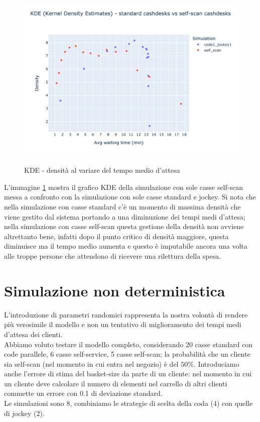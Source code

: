 \begin{figure}[H]
	\centering
	\includegraphics[width=12cm]{"images/results/kde_self_scan.png"}
	\label{fig:kde_self_scan}
	\caption{KDE - densità al variare del tempo medio d'attesa}
\end{figure}

L'immagine \ref{fig:kde_self_scan} mostra il grafico KDE della simulazione con sole casse self-scan messa a confronto con la simulazione con sole casse standard e jockey. Si nota che nella simulazione con casse standard c'è un momento di massima densità che viene gestito dal sistema portando a una diminuzione dei tempi medi d'attesa; nella simulazione con casse self-scan questa gestione della densità non avviene altrettanto bene, infatti dopo il punto critico di densità maggiore, questa diminuisce ma il tempo medio aumenta e questo è imputabile ancora una volta alle troppe persone che attendono di ricevere una rilettura della spesa.

\section{Simulazione non deterministica}

L'introduzione di parametri randomici rappresenta la nostra volontà di rendere più verosimile il modello e non un tentativo di miglioramento dei tempi medi d'attesa dei clienti. \\
Abbiamo voluto testare il modello completo, considerando 20 casse standard con code parallele, 6 casse self-service, 5 casse self-scan; la probabilità che un cliente sia self-scan (nel momento in cui entra nel negozio) è del $50\%$. Introduciamo anche l'errore di stima del basket-size da parte di un cliente: nel momento in cui un cliente deve calcolare il numero di elementi nel carrello di altri clienti commette un errore con 0.1 di deviazione standard. \\
Le simulazioni sono 8, combiniamo le strategie di scelta della coda (4) con quelle di jockey (2).

